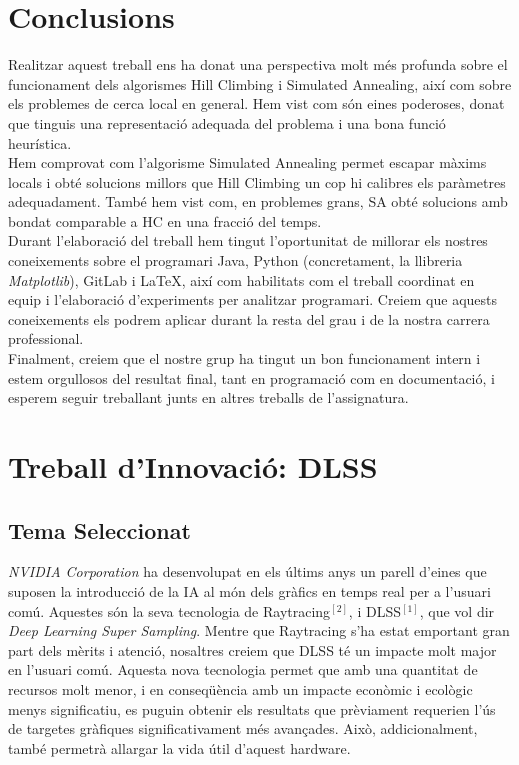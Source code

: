 \documentclass[a4paper]{article}
\begin{document}
\newpage
\section{Conclusions}
Realitzar aquest treball ens ha donat una perspectiva molt més profunda sobre el funcionament dels algorismes Hill Climbing i Simulated Annealing, així com sobre els problemes de cerca local en general. Hem vist com són eines poderoses, donat que tinguis una representació adequada del problema i una bona funció heurística.\\

Hem comprovat com l'algorisme Simulated Annealing permet escapar màxims locals i obté solucions millors que Hill Climbing un cop hi calibres els paràmetres adequadament. També hem vist com, en problemes grans, SA obté solucions amb bondat comparable a HC en una fracció del temps.\\

Durant l'elaboració del treball hem tingut l'oportunitat de millorar els nostres coneixements sobre el programari Java, Python (concretament, la llibreria \emph{Matplotlib}), GitLab i \LaTeX, així com habilitats com el treball coordinat en equip i l'elaboració d'experiments per analitzar programari. Creiem que aquests coneixements els podrem aplicar durant la resta del grau i de la nostra carrera professional.\\

Finalment, creiem que el nostre grup ha tingut un bon funcionament intern i estem orgullosos del resultat final, tant en programació com en documentació, i esperem seguir treballant junts en altres treballs de l'assignatura.

\newpage
\section{Treball d'Innovació: DLSS}
\subsection{Tema Seleccionat}
\emph{NVIDIA Corporation} ha desenvolupat en els últims anys un parell d'eines que suposen la introducció de la IA al món dels gràfics en temps real per a l'usuari comú. Aquestes són la seva tecnologia de Raytracing$^{[2]}$, i DLSS$^{[1]}$, que vol dir \emph{Deep Learning Super Sampling}. Mentre que Raytracing s'ha estat emportant gran part dels mèrits i atenció, nosaltres creiem que DLSS té un impacte molt major en l'usuari comú. Aquesta nova tecnologia permet que amb una quantitat de recursos molt menor, i en conseqüència amb un impacte econòmic i ecològic menys significatiu, es puguin obtenir els resultats que prèviament requerien l'ús de targetes gràfiques significativament més avançades. Això, addicionalment, també permetrà allargar la vida útil d'aquest hardware.
\end{document}

